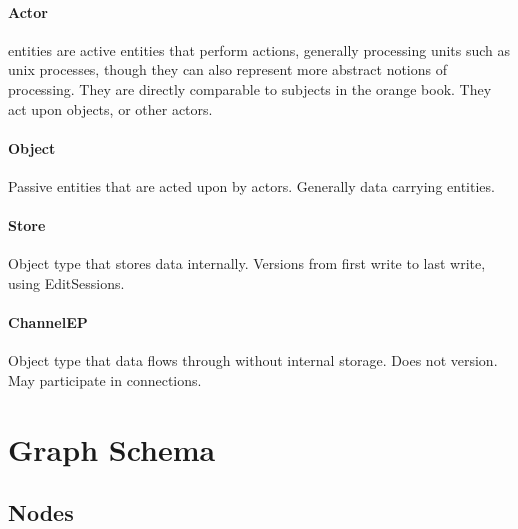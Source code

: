 \documentclass[12pt,twoside,a4paper]{article}
\begin{document}
\paragraph{Actor}
\label{sec:ty:actor}
 entities are active entities that perform actions, generally processing units such as unix processes, though they can also represent more abstract notions of processing. They are directly comparable to subjects in the orange book. They act upon objects, or other actors.

\paragraph{Object}
Passive entities that are acted upon by actors. Generally data carrying entities.

\paragraph{Store}
Object type that stores data internally. Versions from first write to last write, using EditSessions.

\paragraph{ChannelEP}
Object type that data flows through without internal storage. Does not version. May participate in connections.

\section{Graph Schema}

\subsection{Nodes}
\end{document}
